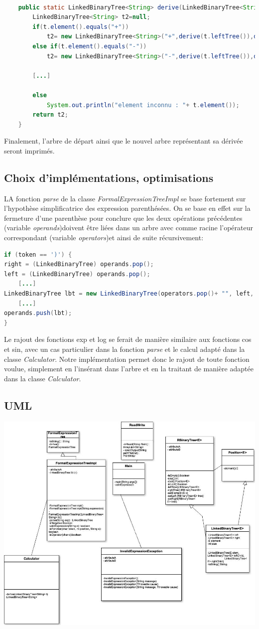 \documentclass[a4paper]{article}
\begin{document}
\begin{lstlisting}[language=Java]

	public static LinkedBinaryTree<String> derive(LinkedBinaryTree<String> t){
		LinkedBinaryTree<String> t2=null;		
		if(t.element().equals("+"))
			t2= new LinkedBinaryTree<String>("+",derive(t.leftTree()),derive(t.rightTree()));			
		else if(t.element().equals("-"))
			t2= new LinkedBinaryTree<String>("-",derive(t.leftTree()),derive(t.rightTree()));
		
		[...]
		
		else
			System.out.println("element inconnu : "+ t.element());		
		return t2;	
	}
\end{lstlisting}


Finalement, l'arbre de départ ainsi que le nouvel arbre représentant sa dérivée seront imprimés.	

\subsection*{Choix d'implémentations, optimisations}

LA fonction \textit{parse} de la classe \textit{FormalExpressionTreeImpl} se base fortement sur l'hypothèse simplificatrice des expression parenthésées. On se base en effet sur la fermeture d'une parenthèse pour conclure que les deux opérations précédentes (variable \textit{operands})doivent être liées dans un arbre avec comme racine l'opérateur correspondant (variable \textit{operators})et ainsi de suite récursivement: 

\begin{lstlisting}[language=Java]
if (token == ')') {
right = (LinkedBinaryTree) operands.pop();
left = (LinkedBinaryTree) operands.pop();
	[...]
LinkedBinaryTree lbt = new LinkedBinaryTree(operators.pop()+ "", left, right);
	[...]
operands.push(lbt);
}
\end{lstlisting}

Le rajout des fonctions exp et log se ferait de manière similaire aux fonctions cos et sin, avec un cas particulier dans la fonction  \textit{parse} et le calcul adapté dans la classe \textit{Calculator}. Notre implémentation permet donc le rajout de toute fonction voulue, simplement en l'insérant dans l'arbre et en la traitant de manière adaptée dans la classe \textit{Calculator}.

\subsection*{UML}

\includegraphics[scale=0.5]{uml}
\end{document}
